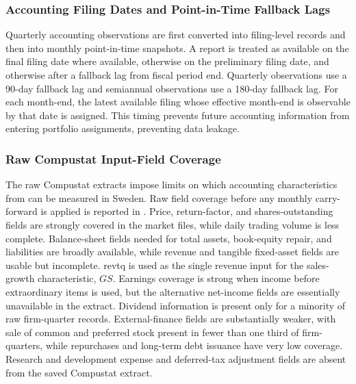 \documentclass[11pt]{article}
\newcommand{\var}[1]{\ensuremath{#1}}
\newcommand{\repo}[1]{\textnormal{\small #1}}
\begin{document}
\subsubsection{Accounting Filing Dates and Point-in-Time Fallback Lags}
\label{app:accounting_filing_lags}

Quarterly accounting observations are first converted into filing-level records and then into monthly point-in-time snapshots. A report is treated as available on the final filing date where available, otherwise on the preliminary filing date, and otherwise after a fallback lag from fiscal period end. Quarterly observations use a 90-day fallback lag and semiannual observations use a 180-day fallback lag. For each month-end, the latest available filing whose effective month-end is observable by that date is assigned. This timing prevents future accounting information from entering portfolio assignments, preventing data leakage.


\subsubsection{Raw Compustat Input-Field Coverage}

The raw Compustat extracts impose limits on which accounting characteristics from \citet{baker2006sentiment} can be measured in Sweden. Raw field coverage before any monthly carry-forward is applied is reported in . Price, return-factor, and shares-outstanding fields are strongly covered in the market files, while daily trading volume is less complete. Balance-sheet fields needed for total assets, book-equity repair, and liabilities are broadly available, while revenue and tangible fixed-asset fields are usable but incomplete. \repo{revtq} is used as the single revenue input for the sales-growth characteristic, \var{GS}. Earnings coverage is strong when income before extraordinary items is used, but the alternative net-income fields are essentially unavailable in the extract. Dividend information is present only for a minority of raw firm-quarter records. External-finance fields are substantially weaker, with sale of common and preferred stock present in fewer than one third of firm-quarters, while repurchases and long-term debt issuance have very low coverage. Research and development expense and deferred-tax adjustment fields are absent from the saved Compustat extract.
\end{document}
